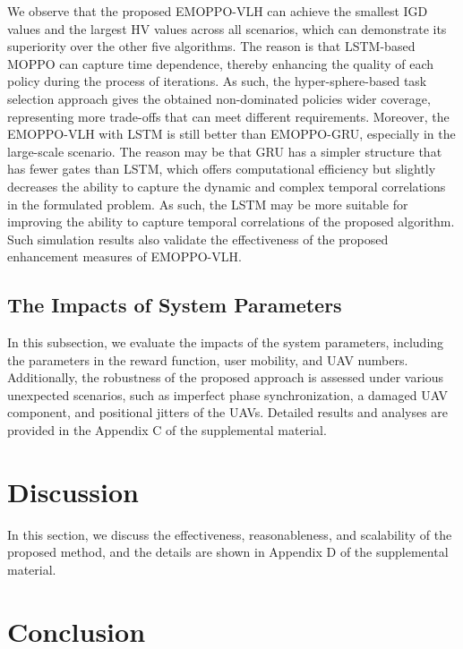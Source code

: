 \documentclass[10pt,journal,compsoc]{IEEEtran}
\begin{document}
\par We observe that the proposed EMOPPO-VLH can achieve the smallest IGD values and the largest HV values across all scenarios, which can demonstrate its superiority over the other five algorithms. The reason is that LSTM-based MOPPO can capture time dependence, thereby enhancing the quality of each policy during the process of iterations. As such, the hyper-sphere-based task selection approach gives the obtained non-dominated policies wider coverage, representing more trade-offs that can meet different requirements. Moreover, the EMOPPO-VLH with LSTM is still better than EMOPPO-GRU, especially in the large-scale scenario. The reason may be that GRU has a simpler structure that has fewer gates than LSTM, which offers computational efficiency but slightly decreases the ability to capture the dynamic and complex temporal correlations in the formulated problem. As such, the LSTM may be more suitable for improving the ability to capture temporal correlations of the proposed algorithm. Such simulation results also validate the effectiveness of the proposed enhancement measures of EMOPPO-VLH.

\subsection{The Impacts of System Parameters}

\par In this subsection, we evaluate the impacts of the system parameters, including the parameters in the reward function, user mobility, and UAV numbers. Additionally, the robustness of the proposed approach is assessed under various unexpected scenarios, such as imperfect phase synchronization, a damaged UAV component, and positional jitters of the UAVs. Detailed results and analyses are provided in the Appendix C of the supplemental material.

%
%
\section{Discussion}
\label{sec:discussion}

\par In this section, we discuss the effectiveness, reasonableness, and scalability of the proposed method, and the details are shown in Appendix D of the supplemental material. 




\section{Conclusion}
\label{sec:conclusion}
\end{document}
